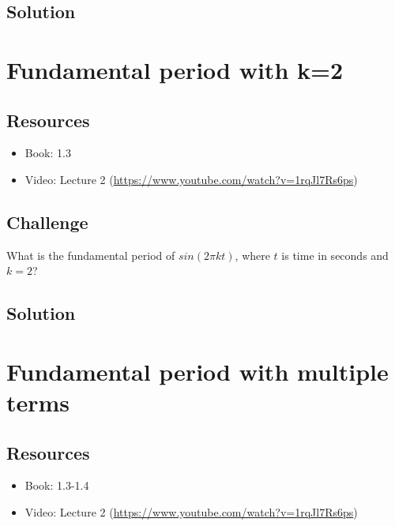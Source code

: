 \subsection*{Solution}





\newpage

\section{Fundamental period with k=2}

\subsection*{Resources}
\begin{itemize}
    \item Book: 1.3
    \item Video: Lecture 2 (\url{https://www.youtube.com/watch?v=1rqJl7Rs6ps})
\end{itemize}

\subsection*{Challenge}
What is the fundamental period of $sin(2 \pi k t)$, where $t$ is time in seconds and $k=2$?

\subsection*{Solution}





\newpage

\section{Fundamental period with multiple terms}

\subsection*{Resources}
\begin{itemize}
    \item Book: 1.3-1.4
    \item Video: Lecture 2 (\url{https://www.youtube.com/watch?v=1rqJl7Rs6ps})
\end{itemize}

